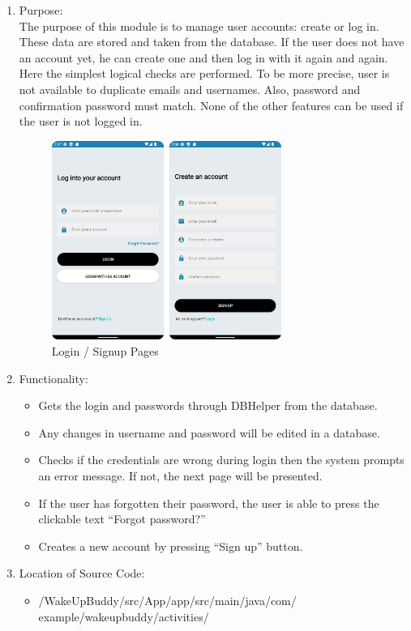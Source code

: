 \documentclass[conference]{IEEEtran}
\begin{document}
\begin{enumerate}
    \item Purpose: \\
        The purpose of this module is to manage user accounts: create or log in. These data are stored and taken from the database. If the user does not have an account yet, he can create one and then log in with it again and again. Here the simplest logical checks are performed. To be more precise, user is not available to duplicate emails and usernames. Also, password and confirmation password must match. None of the other features can be used if the user is not logged in.\\ 

    \begin{figure}[htbp]
        \centerline{\includegraphics[height=65mm,scale=0.5]{Images/App_Login_Signup.png}}
        \caption{Login / Signup Pages}
        \label{fig}
    \end{figure}
    
    \item Functionality: 
    \begin{itemize}
        \item Gets the login and passwords through DBHelper from the database.
        \item Any changes in username and password will be edited in a database.
        \item  Checks if the credentials are wrong during login then the system prompts an error message. If not, the next page will be presented.
        \item  If the user has forgotten their password, the user is able to press the clickable text “Forgot password?”
        \item Creates a new account by pressing “Sign up” button.
    \end{itemize} 
    \item Location of Source Code:
    \begin{itemize}
        \item /WakeUpBuddy/src/App/app/src/main/java/com/
        example/wakeupbuddy/activities/
    

\end{itemize}
\end{enumerate}
\end{document}
